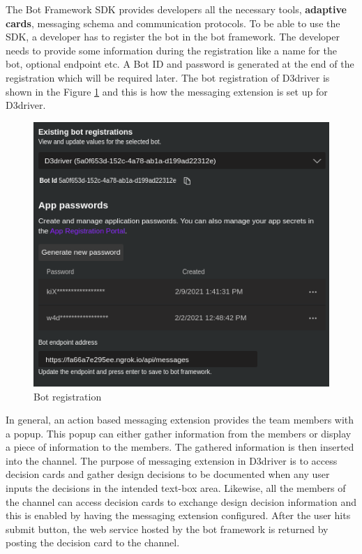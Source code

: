 The Bot Framework SDK provides developers all the necessary tools, \textbf{adaptive cards}, messaging schema and communication protocols. To be able to use the SDK, a developer has to register the bot in the bot framework. The developer needs to provide some information during the registration like a name for the bot, optional endpoint etc. A Bot ID and password is generated at the end of the registration which will be required later. The bot registration of D3driver is shown in the Figure \ref{fig:botreg} and this is how the messaging extension is set up for D3driver.

\begin{figure}[h]
\centering
\includegraphics[width=0.8\linewidth]{figures/botreg}
\captionsetup{justification=centering}
\caption{Bot registration}
\label{fig:botreg}
\end{figure}


In general, an action based messaging extension provides the team members with a popup. This popup can either gather information from the members or display a piece of information to the members. The gathered information is then inserted into the channel. The purpose of messaging extension in D3driver is to access decision cards and gather design decisions to be documented when any user inputs the decisions in the intended text-box area. Likewise, all the members of the channel can access decision cards to exchange design decision information and this is enabled by having the messaging extension configured.  After the user hits submit button, the web service hosted by the bot framework is returned by posting the decision card to the channel. 

